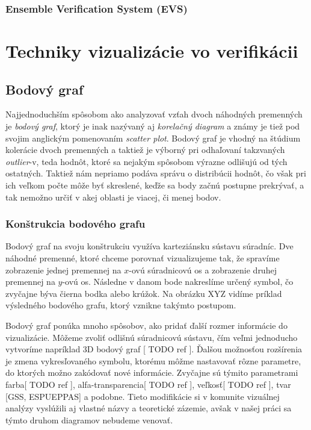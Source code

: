 \subsubsection[EVS]{Ensemble Verification System (EVS)}



\section{Techniky vizualizácie vo verifikácii}
\label{sec:prevvis}

\subsection{Bodový graf}
\label{subsec:scatterplot}
Najjednoduchším spôsobom ako analyzovať vzťah dvoch náhodných premenných je \textit{bodový graf}, ktorý je inak nazývaný aj \textit{korelačný diagram} a známy je tiež pod svojim anglickým pomenovaním \textit{scatter plot}. Bodový graf je vhodný na štúdium kolerácie dvoch premenných a taktiež je výborný pri odhaľovaní takzvaných \textit{outlier}-v, teda hodnôt, ktoré sa nejakým spôsobom výrazne odlišujú od tých ostatných. Taktiež nám nepriamo podáva správu o distribúcii hodnôt, čo však pri ich veľkom počte môže byť skreslené, keďže sa body začnú postupne prekrývať, a tak nemožno určiť v akej oblasti je viacej, či menej bodov.


\subsubsection{Konštrukcia bodového grafu}
Bodový graf na svoju konštrukciu využíva karteziánsku sústavu súradníc. Dve náhodné premenné, ktoré chceme porovnať vizualizujeme tak, že spravíme zobrazenie jednej premennej na $ x $-ovú súradnicovú os a zobrazenie druhej premennej na $ y $-ovú os. Následne v danom bode nakreslíme určený symbol, čo zvyčajne býva čierna bodka alebo krúžok. 
Na obrázku XYZ vidíme príklad výsledného bodového grafu, ktorý vznikne takýmto postupom.

Bodový graf ponúka mnoho spôsobov, ako pridať ďalší rozmer informácie do vizualizácie. Môžeme zvoliť odlišnú súradnicovú sústavu, čím veľmi jednoducho vytvoríme napríklad 3D bodový graf [ TODO ref ]. Ďalšou možnosťou rozšírenia je zmena vykresľovaného symbolu, ktorému môžme nastavovať rôzne parametre, do ktorých možno zakódovať nové informácie. Zvyčajne sú týmito parametrami farba[ TODO ref ], alfa-transparencia[ TODO ref ], veľkosť[ TODO ref ], tvar [GSS, ESPUEPPAS] a podobne. Tieto modifikácie si v komunite vizuálnej analýzy vyslúžili aj vlastné názvy a teoretické zázemie, avšak v našej práci sa týmto druhom diagramov nebudeme venovať.


